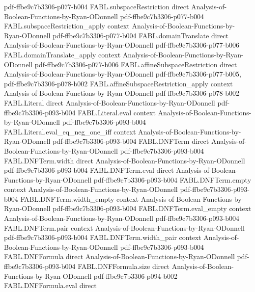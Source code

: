 \begin{theorem}
  {pdf-ffbe9c7b3306-p077-b004}
\proofstep
  {FABL.subspaceRestriction}
  {direct}
  {Analysis-of-Boolean-Functions-by-Ryan-ODonnell}
  {pdf-ffbe9c7b3306-p077-b004}
\proofstep
  {FABL.subspaceRestriction_apply}
  {context}
  {Analysis-of-Boolean-Functions-by-Ryan-ODonnell}
  {pdf-ffbe9c7b3306-p077-b004}
\proofstep
  {FABL.domainTranslate}
  {direct}
  {Analysis-of-Boolean-Functions-by-Ryan-ODonnell}
  {pdf-ffbe9c7b3306-p077-b006}
\proofstep
  {FABL.domainTranslate_apply}
  {context}
  {Analysis-of-Boolean-Functions-by-Ryan-ODonnell}
  {pdf-ffbe9c7b3306-p077-b006}
\proofstep
  {FABL.affineSubspaceRestriction}
  {direct}
  {Analysis-of-Boolean-Functions-by-Ryan-ODonnell}
  {pdf-ffbe9c7b3306-p077-b005,
    pdf-ffbe9c7b3306-p078-b002}
\proofstep
  {FABL.affineSubspaceRestriction_apply}
  {context}
  {Analysis-of-Boolean-Functions-by-Ryan-ODonnell}
  {pdf-ffbe9c7b3306-p078-b002}
\proofstep
  {FABL.Literal}
  {direct}
  {Analysis-of-Boolean-Functions-by-Ryan-ODonnell}
  {pdf-ffbe9c7b3306-p093-b004}
\proofstep
  {FABL.Literal.eval}
  {context}
  {Analysis-of-Boolean-Functions-by-Ryan-ODonnell}
  {pdf-ffbe9c7b3306-p093-b004}
\proofstep
  {FABL.Literal.eval_eq_neg_one_iff}
  {context}
  {Analysis-of-Boolean-Functions-by-Ryan-ODonnell}
  {pdf-ffbe9c7b3306-p093-b004}
\proofstep
  {FABL.DNFTerm}
  {direct}
  {Analysis-of-Boolean-Functions-by-Ryan-ODonnell}
  {pdf-ffbe9c7b3306-p093-b004}
\proofstep
  {FABL.DNFTerm.width}
  {direct}
  {Analysis-of-Boolean-Functions-by-Ryan-ODonnell}
  {pdf-ffbe9c7b3306-p093-b004}
\proofstep
  {FABL.DNFTerm.eval}
  {direct}
  {Analysis-of-Boolean-Functions-by-Ryan-ODonnell}
  {pdf-ffbe9c7b3306-p093-b004}
\proofstep
  {FABL.DNFTerm.empty}
  {context}
  {Analysis-of-Boolean-Functions-by-Ryan-ODonnell}
  {pdf-ffbe9c7b3306-p093-b004}
\proofstep
  {FABL.DNFTerm.width_empty}
  {context}
  {Analysis-of-Boolean-Functions-by-Ryan-ODonnell}
  {pdf-ffbe9c7b3306-p093-b004}
\proofstep
  {FABL.DNFTerm.eval_empty}
  {context}
  {Analysis-of-Boolean-Functions-by-Ryan-ODonnell}
  {pdf-ffbe9c7b3306-p093-b004}
\proofstep
  {FABL.DNFTerm.pair}
  {context}
  {Analysis-of-Boolean-Functions-by-Ryan-ODonnell}
  {pdf-ffbe9c7b3306-p093-b004}
\proofstep
  {FABL.DNFTerm.width_pair}
  {context}
  {Analysis-of-Boolean-Functions-by-Ryan-ODonnell}
  {pdf-ffbe9c7b3306-p093-b004}
\proofstep
  {FABL.DNFFormula}
  {direct}
  {Analysis-of-Boolean-Functions-by-Ryan-ODonnell}
  {pdf-ffbe9c7b3306-p093-b004}
\proofstep
  {FABL.DNFFormula.size}
  {direct}
  {Analysis-of-Boolean-Functions-by-Ryan-ODonnell}
  {pdf-ffbe9c7b3306-p094-b002}
\proofstep
  {FABL.DNFFormula.eval}
  {direct}

\end{theorem}

